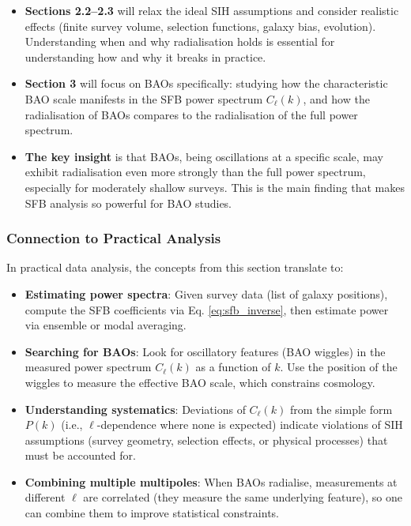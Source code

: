 \begin{itemize}
    \item \textbf{Sections 2.2--2.3} will relax the ideal SIH assumptions and consider realistic effects (finite survey volume, selection functions, galaxy bias, evolution). Understanding when and why radialisation holds is essential for understanding how and why it breaks in practice.
    
    \item \textbf{Section 3} will focus on BAOs specifically: studying how the characteristic BAO scale manifests in the SFB power spectrum $C_\ell(k)$, and how the radialisation of BAOs compares to the radialisation of the full power spectrum.
    
    \item \textbf{The key insight} is that BAOs, being oscillations at a specific scale, may exhibit radialisation even more strongly than the full power spectrum, especially for moderately shallow surveys. This is the main finding that makes SFB analysis so powerful for BAO studies.
\end{itemize}

\subsubsection{Connection to Practical Analysis}

In practical data analysis, the concepts from this section translate to:

\begin{itemize}
    \item \textbf{Estimating power spectra}: Given survey data (list of galaxy positions), compute the SFB coefficients via Eq. \eqref{eq:sfb_inverse}, then estimate power via ensemble or modal averaging.
    
    \item \textbf{Searching for BAOs}: Look for oscillatory features (BAO wiggles) in the measured power spectrum $C_\ell(k)$ as a function of $k$. Use the position of the wiggles to measure the effective BAO scale, which constrains cosmology.
    
    \item \textbf{Understanding systematics}: Deviations of $C_\ell(k)$ from the simple form $P(k)$ (i.e., $\ell$-dependence where none is expected) indicate violations of SIH assumptions (survey geometry, selection effects, or physical processes) that must be accounted for.
    
    \item \textbf{Combining multiple multipoles}: When BAOs radialise, measurements at different $\ell$ are correlated (they measure the same underlying feature), so one can combine them to improve statistical constraints.
\end{itemize}


